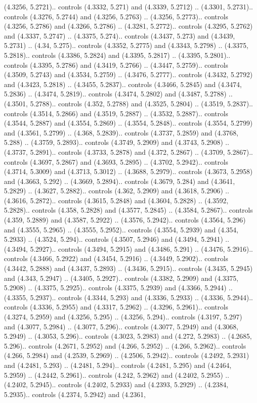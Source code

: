(4.3256, 5.2721).. controls (4.3332, 5.271) and (4.3339, 5.2712) .. (4.3301, 5.2731).. controls (4.3276, 5.2744) and (4.3256, 5.2763) .. (4.3256, 5.2773).. controls (4.3256, 5.2786) and (4.3266, 5.2786) .. (4.3281, 5.2772).. controls (4.3295, 5.2762) and (4.3337, 5.2747) .. (4.3375, 5.274).. controls (4.3437, 5.273) and (4.3439, 5.2731) .. (4.34, 5.275).. controls (4.3352, 5.2775) and (4.3343, 5.2798) .. (4.3375, 5.2818).. controls (4.3386, 5.2824) and (4.3395, 5.2817) .. (4.3395, 5.2801).. controls (4.3395, 5.2786) and (4.3419, 5.2766) .. (4.3447, 5.2759).. controls (4.3509, 5.2743) and (4.3534, 5.2759) .. (4.3476, 5.2777).. controls (4.3432, 5.2792) and (4.3423, 5.2818) .. (4.3455, 5.2837).. controls (4.3466, 5.2845) and (4.3474, 5.2836) .. (4.3474, 5.2819).. controls (4.3474, 5.2802) and (4.3487, 5.2788) .. (4.3501, 5.2788).. controls (4.352, 5.2788) and (4.3525, 5.2804) .. (4.3519, 5.2837).. controls (4.3514, 5.2866) and (4.3519, 5.2887) .. (4.3532, 5.2887).. controls (4.3544, 5.2887) and (4.3554, 5.2869) .. (4.3554, 5.2848).. controls (4.3554, 5.2799) and (4.3561, 5.2799) .. (4.368, 5.2839).. controls (4.3737, 5.2859) and (4.3768, 5.288) .. (4.3759, 5.2893).. controls (4.3749, 5.2909) and (4.3743, 5.2908) .. (4.3737, 5.2891).. controls (4.3733, 5.2878) and (4.372, 5.2867) .. (4.3709, 5.2867).. controls (4.3697, 5.2867) and (4.3693, 5.2895) .. (4.3702, 5.2942).. controls (4.3714, 5.3009) and (4.3713, 5.3012) .. (4.3688, 5.2979).. controls (4.3673, 5.2958) and (4.3663, 5.292) .. (4.3669, 5.2894).. controls (4.3679, 5.284) and (4.3641, 5.2829) .. (4.3627, 5.2882).. controls (4.362, 5.2909) and (4.3618, 5.2906) .. (4.3616, 5.2872).. controls (4.3615, 5.2848) and (4.3604, 5.2828) .. (4.3592, 5.2828).. controls (4.358, 5.2828) and (4.3577, 5.2845) .. (4.3584, 5.2867).. controls (4.359, 5.2889) and (4.3587, 5.2922) .. (4.3576, 5.2942).. controls (4.3564, 5.296) and (4.3555, 5.2965) .. (4.3555, 5.2952).. controls (4.3554, 5.2939) and (4.354, 5.2933) .. (4.3524, 5.294).. controls (4.3507, 5.2946) and (4.3494, 5.2941) .. (4.3494, 5.2927).. controls (4.3494, 5.2915) and (4.3486, 5.291) .. (4.3476, 5.2916).. controls (4.3466, 5.2922) and (4.3454, 5.2916) .. (4.3449, 5.2902).. controls (4.3442, 5.2888) and (4.3437, 5.2893) .. (4.3436, 5.2915).. controls (4.3435, 5.2945) and (4.343, 5.2947) .. (4.3405, 5.2927).. controls (4.3382, 5.2909) and (4.3375, 5.2908) .. (4.3375, 5.2925).. controls (4.3375, 5.2939) and (4.3366, 5.2944) .. (4.3355, 5.2937).. controls (4.3344, 5.293) and (4.3336, 5.2933) .. (4.3336, 5.2944).. controls (4.3336, 5.2955) and (4.3317, 5.2962) .. (4.3296, 5.2961).. controls (4.3274, 5.2959) and (4.3256, 5.295) .. (4.3256, 5.294).. controls (4.3197, 5.297) and (4.3077, 5.2984) .. (4.3077, 5.296).. controls (4.3077, 5.2949) and (4.3068, 5.2949) .. (4.3053, 5.296).. controls (4.3023, 5.2983) and (4.272, 5.2983) .. (4.2685, 5.296).. controls (4.2671, 5.2952) and (4.266, 5.2952) .. (4.266, 5.2962).. controls (4.266, 5.2984) and (4.2539, 5.2969) .. (4.2506, 5.2942).. controls (4.2492, 5.2931) and (4.2481, 5.293) .. (4.2481, 5.294).. controls (4.2481, 5.295) and (4.2464, 5.2959) .. (4.2442, 5.2961).. controls (4.242, 5.2962) and (4.2402, 5.2955) .. (4.2402, 5.2945).. controls (4.2402, 5.2933) and (4.2393, 5.2929) .. (4.2384, 5.2935).. controls (4.2374, 5.2942) and (4.2361, 